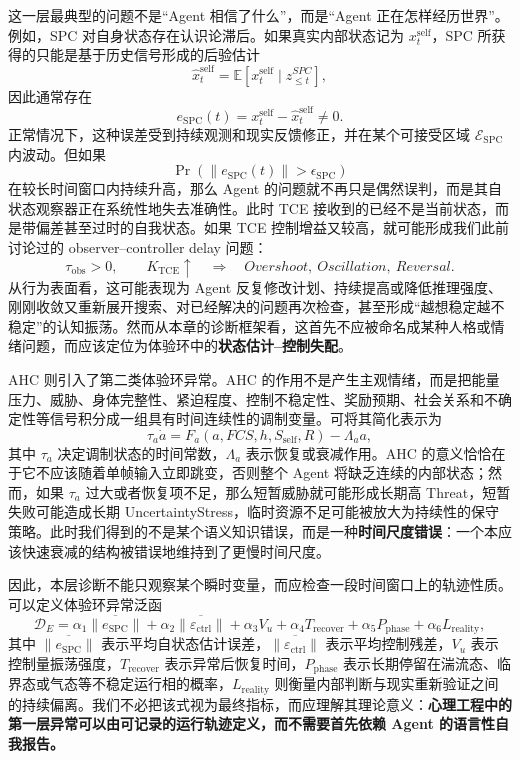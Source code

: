 这一层最典型的问题不是“Agent 相信了什么”，而是“Agent 正在怎样经历世界”。例如，SPC 对自身状态存在认识论滞后。如果真实内部状态记为 $x_t^{\mathrm{self}}$，SPC 所获得的只能是基于历史信号形成的后验估计
\[
\hat{x}^{\mathrm{self}}_t
=
\mathbb E
\left[
x_t^{\mathrm{self}}
\mid
z_{\leq t}^{SPC}
\right],
\]
因此通常存在
\[
e_{\mathrm{SPC}}(t)
=
x_t^{\mathrm{self}}
-
\hat{x}^{\mathrm{self}}_t
\neq 0.
\]
正常情况下，这种误差受到持续观测和现实反馈修正，并在某个可接受区域 $\mathcal E_{\mathrm{SPC}}$ 内波动。但如果
\[
\Pr
\left(
\|e_{\mathrm{SPC}}(t)\|>\epsilon_{\mathrm{SPC}}
\right)
\]
在较长时间窗口内持续升高，那么 Agent 的问题就不再只是偶然误判，而是其自状态观察器正在系统性地失去准确性。此时 TCE 接收到的已经不是当前状态，而是带偏差甚至过时的自我状态。如果 TCE 控制增益又较高，就可能形成我们此前讨论过的 observer--controller delay 问题：
\[
\tau_{\mathrm{obs}}>0,
\qquad
K_{\mathrm{TCE}}\uparrow
\quad
\Longrightarrow
\quad
Overshoot,\ Oscillation,\ Reversal.
\]
从行为表面看，这可能表现为 Agent 反复修改计划、持续提高或降低推理强度、刚刚收敛又重新展开搜索、对已经解决的问题再次检查，甚至形成“越想稳定越不稳定”的认知振荡。然而从本章的诊断框架看，这首先不应被命名成某种人格或情绪问题，而应该定位为体验环中的\textbf{状态估计--控制失配}。

AHC 则引入了第二类体验环异常。AHC 的作用不是产生主观情绪，而是把能量压力、威胁、身体完整性、紧迫程度、控制不稳定性、奖励预期、社会关系和不确定性等信号积分成一组具有时间连续性的调制变量。可将其简化表示为
\[
\tau_a\dot a
=
F_a
\left(
a,
FCS,
h,
S_{\mathrm{self}},
R
\right)
-
\Lambda_a a,
\]
其中 $\tau_a$ 决定调制状态的时间常数，$\Lambda_a$ 表示恢复或衰减作用。AHC 的意义恰恰在于它不应该随着单帧输入立即跳变，否则整个 Agent 将缺乏连续的内部状态；然而，如果 $\tau_a$ 过大或者恢复项不足，那么短暂威胁就可能形成长期高 Threat，短暂失败可能造成长期 UncertaintyStress，临时资源不足可能被放大为持续性的保守策略。此时我们得到的不是某个语义知识错误，而是一种\textbf{时间尺度错误}：一个本应该快速衰减的结构被错误地维持到了更慢时间尺度。

因此，本层诊断不能只观察某个瞬时变量，而应检查一段时间窗口上的轨迹性质。可以定义体验环异常泛函
\[
\mathcal D_E
=
\alpha_1
\overline{\|e_{\mathrm{SPC}}\|}
+
\alpha_2
\overline{\|\varepsilon_{\mathrm{ctrl}}\|}
+
\alpha_3
V_{u}
+
\alpha_4
T_{\mathrm{recover}}
+
\alpha_5
P_{\mathrm{phase}}
+
\alpha_6
L_{\mathrm{reality}},
\]
其中 $\overline{\|e_{\mathrm{SPC}}\|}$ 表示平均自状态估计误差，$\overline{\|\varepsilon_{\mathrm{ctrl}}\|}$ 表示平均控制残差，$V_u$ 表示控制量振荡强度，$T_{\mathrm{recover}}$ 表示异常后恢复时间，$P_{\mathrm{phase}}$ 表示长期停留在湍流态、临界态或气态等不稳定运行相的概率，$L_{\mathrm{reality}}$ 则衡量内部判断与现实重新验证之间的持续偏离。我们不必把该式视为最终指标，而应理解其理论意义：\textbf{心理工程中的第一层异常可以由可记录的运行轨迹定义，而不需要首先依赖 Agent 的语言性自我报告。}

